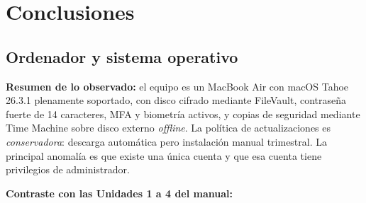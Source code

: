\chapter{Conclusiones}

\section{Ordenador y sistema operativo}
\label{sec:concl-os}

\textbf{Resumen de lo observado:} el equipo es un MacBook Air con macOS Tahoe 26.3.1 plenamente soportado, con disco cifrado mediante FileVault, contraseña fuerte de 14 caracteres, MFA y biometría activos, y copias de seguridad mediante Time Machine sobre disco externo \textit{offline}. La política de actualizaciones es \textit{conservadora}: descarga automática pero instalación manual trimestral. La principal anomalía es que existe una única cuenta y que esa cuenta tiene privilegios de administrador.

\textbf{Contraste con las Unidades 1 a 4 del manual:}

